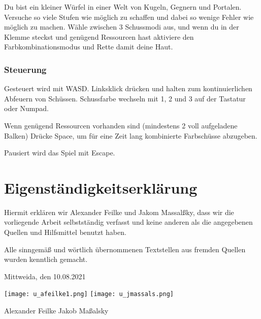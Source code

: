 \documentclass[a4paper,ngerman,12pt]{report}
\begin{document}
Du bist ein kleiner Würfel in einer Welt von Kugeln, Gegnern und Portalen. Versuche so viele Stufen wie möglich zu schaffen und dabei so wenige Fehler wie möglich zu machen. Wähle zwischen 3 Schussmodi aus, und wenn du in der Klemme steckst und genügend Ressourcen hast aktiviere den Farbkombinationsmodus und Rette damit deine Haut.



\subsection{Steuerung}

Gesteuert wird mit WASD. Linksklick drücken und halten zum kontinuierlichen Abfeuern von Schüssen. Schussfarbe wechseln mit 1, 2 und 3 auf der Tastatur oder Numpad.

Wenn genügend Ressourcen vorhanden sind (mindestens 2 voll aufgeladene Balken) Drücke Space, um für eine Zeit lang kombinierte Farbschüsse abzugeben.

Pausiert wird das Spiel mit Escape.





\chapter{Eigenständigkeitserklärung}

Hiermit erklären wir Alexander Feilke und Jakom Massal{\ss}ky, dass wir die vorliegende Arbeit selbstständig verfasst und keine anderen als die angegebenen Quellen und Hilfsmittel benutzt haben.

Alle sinngemä{\ss} und wörtlich übernommenen Textstellen aus fremden Quellen wurden kenntlich gemacht.

Mittweida, den 10.08.2021

\vspace{2cm}

\texttt{[image: u\_afeilke1.png]} \hspace{3cm} \texttt{[image: u\_jmassals.png]}

Alexander Feilke \hspace{4cm} Jakob Ma{\ss}alsky
\end{document}
